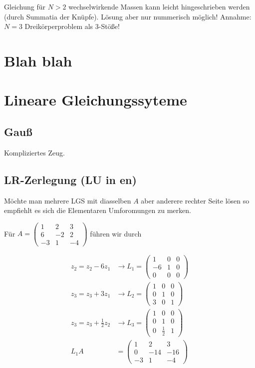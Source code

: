 \documentclass[a4paper,ngerman]{scrbook}
\begin{document}
Gleichung für $N>2$ wechselwirkende Massen kann leicht hingeschrieben werden (durch Summatia der Knüpfe). Lösung aber nur nummerisch möglich! Annahme: $N=3$ Dreikörperproblem als 3-Stöße!

\chapter{Blah blah}

\chapter{Lineare Gleichungssyteme}
\section{Gauß}

Kompliziertes Zeug.

\section{LR-Zerlegung (LU in en)}

Möchte man mehrere LGS mit diasselben $A$ aber anderere rechter Seite lösen so empfiehlt es sich die Elementaren Umforomungen zu merken.

Für $A =
\begin{pmatrix}
  1 & 2 & 3\\
  6 & -2 & 2\\
  -3 & 1 & -4
\end{pmatrix}
$ führen wir durch

\begin{align*}
z_2 = z_2 - 6z_1 &\to L_1 =
\begin{pmatrix}
  1 & 0 & 0\\
  -6 & 1 & 0\\
  0 & 0 & 0
\end{pmatrix}\\
  z_3 = z_3 + 3z_1 &\to L_2 =
  \begin{pmatrix}
    1 & 0 & 0\\
    0 & 1 & 0\\
    3 & 0 & 1
  \end{pmatrix}\\
  z_3 = z_3 + \frac{1}{2}z_2 &\to L_3 =
  \begin{pmatrix}
    1 & 0 & 0\\
    0 & 1 & 0\\
    0 & \frac{1}{2} & 1
  \end{pmatrix}\\
L_1A &=
\begin{pmatrix}
  1 & 2 & 3\\
  0 & -14 & -16\\
  -3 & 1 & -4
\end{pmatrix}
\end{align*}
\end{document}
